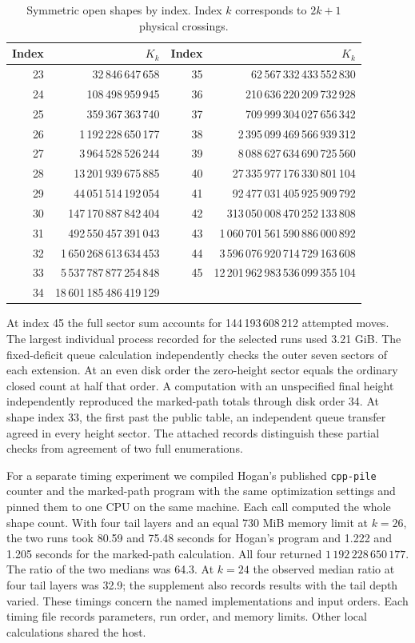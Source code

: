 \begin{table}[htbp]\centering
\begin{tabular}{rr@{\hspace{2em}}rr}\toprule
Index&\(K_k\)&Index&\(K_k\)\\\midrule
23 & 32\,846\,647\,658 & 35 & 62\,567\,332\,433\,552\,830\\
24 & 108\,498\,959\,945 & 36 & 210\,636\,220\,209\,732\,928\\
25 & 359\,367\,363\,740 & 37 & 709\,999\,304\,027\,656\,342\\
26 & 1\,192\,228\,650\,177 & 38 & 2\,395\,099\,469\,566\,939\,312\\
27 & 3\,964\,528\,526\,244 & 39 & 8\,088\,627\,634\,690\,725\,560\\
28 & 13\,201\,939\,675\,885 & 40 & 27\,335\,977\,176\,330\,801\,104\\
29 & 44\,051\,514\,192\,054 & 41 & 92\,477\,031\,405\,925\,909\,792\\
30 & 147\,170\,887\,842\,404 & 42 & 313\,050\,008\,470\,252\,133\,808\\
31 & 492\,550\,457\,391\,043 & 43 & 1\,060\,701\,561\,590\,886\,000\,892\\
32 & 1\,650\,268\,613\,634\,453 & 44 & 3\,596\,076\,920\,714\,729\,163\,608\\
33 & 5\,537\,787\,877\,254\,848 & 45 & 12\,201\,962\,983\,536\,099\,355\,104\\
34 & 18\,601\,185\,486\,419\,129 &  & \\
\bottomrule\end{tabular}
\caption{Symmetric open shapes by index. Index \(k\) corresponds to \(2k+1\) physical crossings.}
\end{table}
At index 45 the full sector sum accounts for 144\,193\,608\,212 attempted moves. The largest individual process recorded for the selected runs used 3.21 GiB. The fixed-deficit queue calculation independently checks the outer seven sectors of each extension. At an even disk order the zero-height sector equals the ordinary closed count at half that order. A computation with an unspecified final height independently reproduced the marked-path totals through disk order 34. At shape index 33, the first past the public table, an independent queue transfer agreed in every height sector. The attached records distinguish these partial checks from agreement of two full enumerations.

For a separate timing experiment we compiled Hogan's published \texttt{cpp-pile} counter and the marked-path program with the same optimization settings and pinned them to one CPU on the same machine. Each call computed the whole shape count. With four tail layers and an equal 730 MiB memory limit at \(k=26\), the two runs took 80.59 and 75.48 seconds for Hogan's program and 1.222 and 1.205 seconds for the marked-path calculation. All four returned \(1\,192\,228\,650\,177\). The ratio of the two medians was 64.3. At \(k=24\) the observed median ratio at four tail layers was 32.9; the supplement also records results with the tail depth varied. These timings concern the named implementations and input orders. Each timing file records parameters, run order, and memory limits. Other local calculations shared the host.

